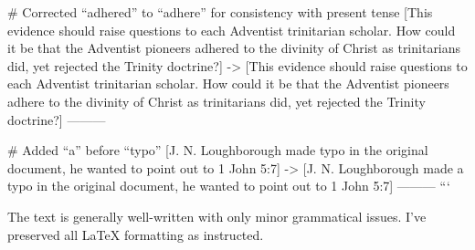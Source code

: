 # Corrected “adhered” to “adhere” for consistency with present tense
[This evidence should raise questions to each Adventist trinitarian scholar. How could it be that the Adventist pioneers adhered to the divinity of Christ as trinitarians did, yet rejected the Trinity doctrine?]
->
[This evidence should raise questions to each Adventist trinitarian scholar. How could it be that the Adventist pioneers adhere to the divinity of Christ as trinitarians did, yet rejected the Trinity doctrine?]
---------

# Added “a” before “typo”
[J. N. Loughborough made typo in the original document, he wanted to point out to 1 John 5:7]
->
[J. N. Loughborough made a typo in the original document, he wanted to point out to 1 John 5:7]
---------
```

The text is generally well-written with only minor grammatical issues. I've preserved all LaTeX formatting as instructed.